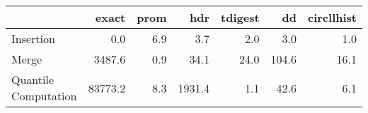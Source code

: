 \begin{tabular}{lrrrrrr}
\toprule
{} &   exact &  prom &    hdr &  tdigest &    dd &  circllhist \\
\midrule
Insertion            &     0.0 &   6.9 &    3.7 &      2.0 &   3.0 &         1.0 \\
Merge                &  3487.6 &   0.9 &   34.1 &     24.0 & 104.6 &        16.1 \\
Quantile Computation & 83773.2 &   8.3 & 1931.4 &      1.1 &  42.6 &         6.1 \\
\bottomrule
\end{tabular}
